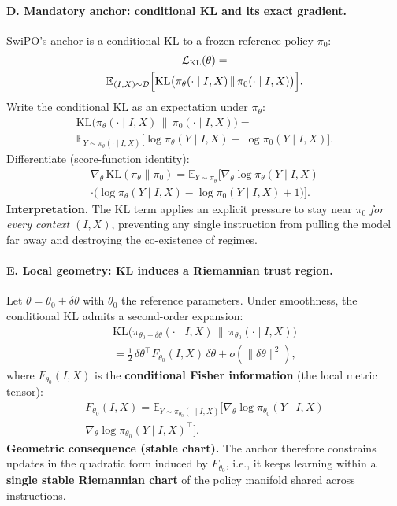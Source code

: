 \vspace{-0.35em}
\paragraph{\textbf{D. Mandatory anchor: conditional KL and its exact gradient.}}
SwiPO's anchor is a conditional KL to a frozen reference policy $\pi_0$:
\begin{multline*}
\mathcal{L}_{\textsc{KL}}(\theta)
=\\
\mathbb{E}_{(I,X)\sim\mathcal{D}}
\Big[
\mathrm{KL}\big(\pi_\theta(\cdot\mid I,X)\,\|\,\pi_0(\cdot\mid I,X)\big)
\Big].
\end{multline*}
Write the conditional KL as an expectation under $\pi_\theta$:
{\small
\begin{multline*}
\mathrm{KL}\big(\pi_\theta(\cdot\mid I,X)\,\|\,\pi_0(\cdot\mid I,X)\big)
=\\
\mathbb{E}_{Y\sim\pi_\theta(\cdot\mid I,X)}
\Big[
\log\pi_\theta(Y\mid I,X)-\log\pi_0(Y\mid I,X)
\Big].
\end{multline*}
}
Differentiate (score-function identity):
\begin{multline*}
\nabla_\theta\,\mathrm{KL}(\pi_\theta\|\pi_0)
=
\mathbb{E}_{Y\sim\pi_\theta}
\Big[
\nabla_\theta\log\pi_\theta(Y\mid I,X)\\
\cdot\big(\log\pi_\theta(Y\mid I,X)-\log\pi_0(Y\mid I,X)+1\big)
\Big].
\end{multline*}
\textbf{Interpretation.} The KL term applies an explicit pressure to stay near $\pi_0$ \emph{for every context $(I,X)$}, preventing any single instruction from pulling the model far away and destroying the co-existence of regimes.

\vspace{-0.35em}
\paragraph{\textbf{E. Local geometry: KL induces a Riemannian trust region.}}
Let $\theta=\theta_0+\delta\theta$ with $\theta_0$ the reference parameters.
Under smoothness, the conditional KL admits a second-order expansion:
\begin{multline*}
\mathrm{KL}\big(\pi_{\theta_0+\delta\theta}(\cdot\mid I,X)\,\|\,\pi_{\theta_0}(\cdot\mid I,X)\big)\\
=
\tfrac{1}{2}\,\delta\theta^\top F_{\theta_0}(I,X)\,\delta\theta
+ o(\|\delta\theta\|^2),
\end{multline*}
where $F_{\theta_0}(I,X)$ is the \textbf{conditional Fisher information} (the local metric tensor):
\begin{multline*}
F_{\theta_0}(I,X)
=
\mathbb{E}_{Y\sim\pi_{\theta_0}(\cdot\mid I,X)}
\Big[
\nabla_\theta\log\pi_{\theta_0}(Y\mid I,X)\\
\nabla_\theta\log\pi_{\theta_0}(Y\mid I,X)^\top
\Big].
\end{multline*}
\textbf{Geometric consequence (stable chart).} The anchor therefore constrains updates in the quadratic form induced by $F_{\theta_0}$, i.e., it keeps learning within a \textbf{single stable Riemannian chart} of the policy manifold shared across instructions.

